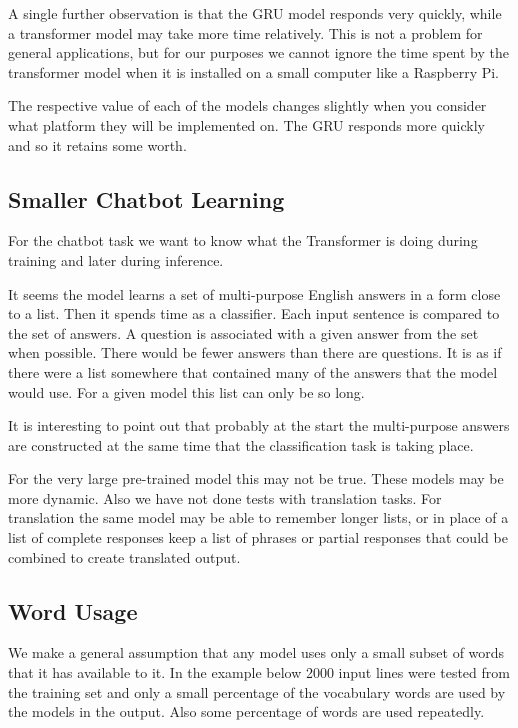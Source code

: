 A single further observation is that the GRU model responds very quickly, while a transformer model may take more time relatively. This is not a problem for general applications, but for our purposes we cannot ignore the time spent by the transformer model when it is installed on a small computer like a Raspberry Pi. 

The respective value of each of the models changes slightly when you consider what platform they will be implemented on. The GRU responds more quickly and so it retains some worth.

\subsection{Smaller Chatbot Learning}

For the chatbot task we want to know what the Transformer is doing during training and later during inference.

It seems the model learns a set of multi-purpose English answers in a form close to a list. Then it spends time as a classifier. Each input sentence is compared to the set of answers. A question is associated with a given answer from the set when possible. There would be fewer answers than there are questions. It is as if there were a list somewhere that contained many of the answers that the model would use. For a given model this list can only be so long.

It is interesting to point out that probably at the start the multi-purpose answers are constructed at the same time that the classification task is taking place. 

For the very large pre-trained model this may not be true. These models may be more dynamic. Also we have not done tests with translation tasks. For translation the same model may be able to remember longer lists, or in place of a list of complete responses keep a list of phrases or partial responses that could be combined to create translated output.

\subsection{Word Usage}

We make a general assumption that any model uses only a small subset of words that it has available to it. In the example below 2000 input lines were tested from the training set and only a small percentage of the vocabulary words are used by the models in the output. Also some percentage of words are used repeatedly.

